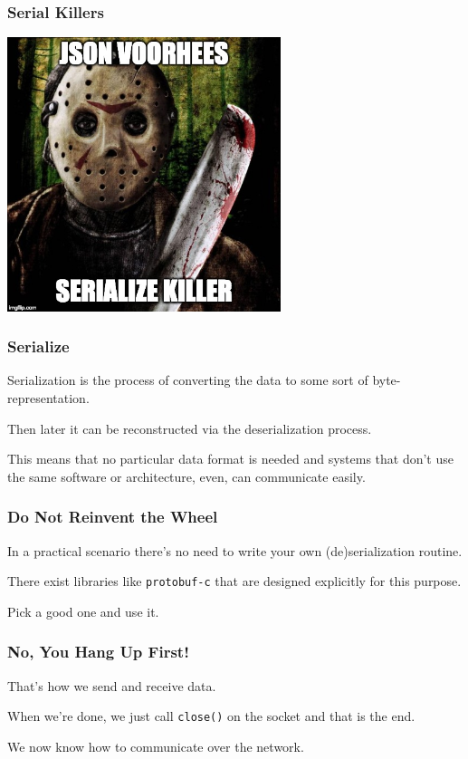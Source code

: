 \begin{frame}
\frametitle{Serial Killers}

\begin{center}
\includegraphics[width=0.6\textwidth]{images/json-serialize-killer.jpg}
\end{center}


\end{frame}



\begin{frame}
\frametitle{Serialize}

Serialization is the process of converting the data to some sort of byte-representation. 

Then later it can be reconstructed via the deserialization process. 

This means that no particular data format is needed and systems that don't use the same software or architecture, even, can communicate easily.

\end{frame}



\begin{frame}
\frametitle{Do Not Reinvent the Wheel}

In a practical scenario there's no need to write your own (de)serialization routine. 

There exist libraries like \texttt{protobuf-c} that are designed explicitly for this purpose. 

Pick a good one and use it.

\end{frame}



\begin{frame}
\frametitle{No, You Hang Up First!}

That's how we send and receive data. 

When we're done, we just call \texttt{close()} on the socket and that is the end. 

We now know how to communicate over the network.


\end{frame}



